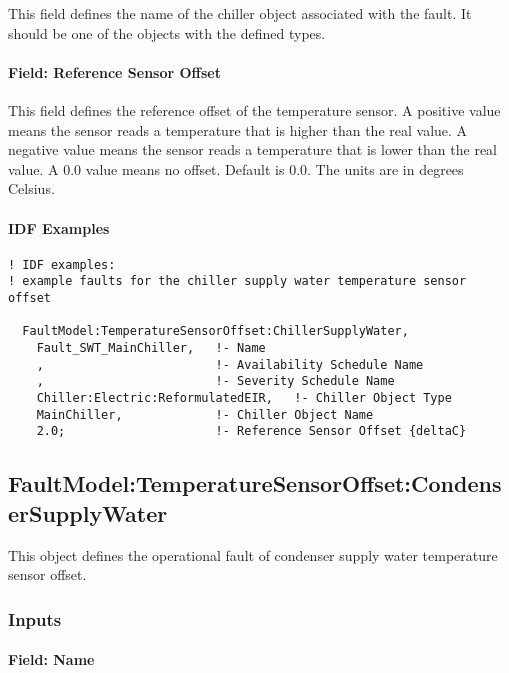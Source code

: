 This field defines the name of the chiller object associated with the fault. It should be one of the objects with the defined types.

\paragraph{Field: Reference Sensor Offset}\label{field-reference-sensor-offset}

This field defines the reference offset of the temperature sensor. A positive value means the sensor reads a temperature that is higher than the real value. A negative value means the sensor reads a temperature that is lower than the real value. A 0.0 value means no offset. Default is 0.0. The units are in degrees Celsius.

\paragraph{IDF Examples}

\begin{lstlisting}
! IDF examples:
! example faults for the chiller supply water temperature sensor offset

  FaultModel:TemperatureSensorOffset:ChillerSupplyWater,
    Fault_SWT_MainChiller,   !- Name
    ,                        !- Availability Schedule Name
    ,                        !- Severity Schedule Name
    Chiller:Electric:ReformulatedEIR,   !- Chiller Object Type
    MainChiller,             !- Chiller Object Name
    2.0;                     !- Reference Sensor Offset {deltaC}

\end{lstlisting}

\subsection{FaultModel:TemperatureSensorOffset:CondenserSupplyWater}\label{faultmodeltemperaturesensoroffsetcondensersupplywater}

This object defines the operational fault of condenser supply water temperature sensor offset.

\subsubsection{Inputs}

\paragraph{Field: Name}

